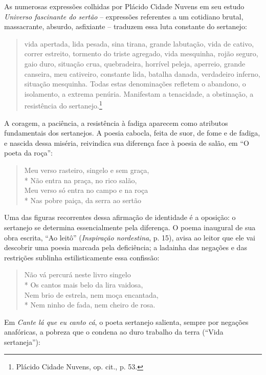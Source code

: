 As numerosas expressões colhidas por Plácido Cidade Nuvens em seu estudo
\textit{Universo fascinante do sertão} -- expressões referentes a um cotidiano brutal,
massacrante, absurdo, asfixiante -- traduzem essa luta constante do sertanejo:

\begin{quote}
vida apertada, lida pesada, sina tirana, grande labutação, vida de cativo,
correr estreito, tormento do triste agregado, vida mesquinha, rojão seguro, gaio
duro, situação crua, quebradeira, horrível peleja, aperreio, grande canseira,
meu cativeiro, constante lida, batalha danada, verdadeiro inferno, situação
mesquinha. Todas estas denominações refletem o abandono, o isolamento, a extrema
penúria. Manifestam a tenacidade, a obstinação, a resistência do
sertanejo.\footnote{ Plácido Cidade Nuvens, op. cit., p. 53.}
\end{quote}

A coragem, a paciência, a resistência à fadiga aparecem como atributos
fundamentais dos sertanejos. A poesia cabocla, feita de suor, de fome e de
fadiga, e nascida dessa miséria, reivindica sua diferença face à poesia de
salão, em “O poeta da roça”:

\begin{verse}
Meu verso rasteiro, singelo e sem graça, \\*
Não entra na praça, no rico salão, \\
Meu verso só entra no campo e na roça \\*
Nas pobre paiça, da serra ao sertão 
\end{verse}

Uma das figuras recorrentes dessa afirmação de identidade é a oposição: o
sertanejo se determina essencialmente pela diferença. O poema inaugural de sua
obra escrita, “Ao leitô” (\textit{Inspiração nordestina}, p. 15), avisa ao leitor que ele vai descobrir uma
poesia marcada pela deficiência; a ladainha das negações e das restrições
sublinha estilisticamente essa confissão:

\begin{verse}
Não vá percurá neste livro singelo\\*
Os cantos mais belo da lira vaidosa,\\
Nem brio de estrela, nem moça encantada,\\*
Nem ninho de fada, nem cheiro de rosa. 
\end{verse}

Em \textit{Cante lá que eu canto cá}, o poeta sertanejo salienta, sempre por negações
anafóricas, a pobreza que o condena ao duro trabalho da terra (“Vida
sertaneja”):

